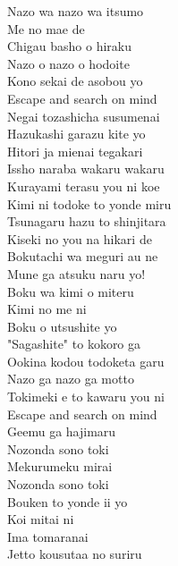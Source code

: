 \def\songtitle{Kimi no Hitomi wo Meguru Bouken}
\def\songcomment{}
\def\songlyrics{Aki Hata}
\def\songwriter{Watanabe Kazunori}
\def\songarrange{Watanabe Kazunori}
   
\ifdefined\COMPLETE
\else
	
	
\fi
\thispagestyle{song}

\begin{multicols}{2}
Nazo wa nazo wa itsumo\\
Me no mae de\\
Chigau basho o hiraku\\
Nazo o nazo o hodoite\\
Kono sekai de asobou yo\\
Escape and search on mind\\

Negai tozashicha susumenai\\
Hazukashi garazu kite yo\\
Hitori ja mienai tegakari\\
Issho naraba wakaru wakaru\\
Kurayami terasu you ni koe\\
Kimi ni todoke to yonde miru\\
Tsunagaru hazu to shinjitara\\
Kiseki no you na hikari de\\

Bokutachi wa meguri au ne\\
Mune ga atsuku naru yo!\\

Boku wa kimi o miteru\\
Kimi no me ni\\
Boku o utsushite yo\\
"Sagashite" to kokoro ga\\
Ookina kodou todoketa garu\\
Nazo ga nazo ga motto\\
Tokimeki e to kawaru you ni\\
Escape and search on mind\\

Geemu ga hajimaru\\
Nozonda sono toki\\
Mekurumeku mirai\\
Nozonda sono toki\\
Bouken to yonde ii yo\\
Koi mitai ni\\
Ima tomaranai\\
Jetto kousutaa no suriru\columnbreak


\end{multicols}
